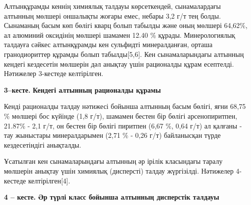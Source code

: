 Алтынқұрамды кеннің химиялық талдауы көрсеткендей, сынамалардағы
алтынның мөлшері оншалықты жоғары емес, небары 3,2 г/т тең болды.
Сынаманың басым көп бөлігі кварц болып табылды және оның мөлшері
64,62\%, ал алюминий оксидінің мөлшері шамамен 12.40 \% құрады.
Минерологиялық талдауға сәйкес алтынқұрамды кен сульфидті минералданған,
орташа гранодиориттер құрамды болып табылды{[}5,6{]}. Кен
сынамаларындағы алтынның кендегі кездесетін мөлшерін дәл анықтау үшін
рационалды құрам есептелді. Нәтижелер 3-кестеде келтірілген.

{\bfseries 3--кесте.} {\bfseries Кендегі алтынның рационалды құрамы}


Кенді рационалды талдау нәтижесі бойынша алтынның басым бөлігі, яғни
68,75 \% мөлшері бос күйінде (1,8 г/т), шамамен бестен бір бөлігі
арсенопиритпен, 21.87\% - 2,1 г/т, он бестен бір бөлігі пиритпен (6,67
\%, 0,64 г/т) ал қалғаны - тау жыныстары минералдарымен (2,71 \% - 0,26
г/т) байланысқан түрде кездесетіндігі анықталды.

Ұсатылған кен сынамаларындағы алтынның әр ірілік класындағы таралу
мөлшерін анықтау үшін химиялық (дисперсті) талдау жүргізілді. Нәтижелер
4-кестеде келтірілген{[}4{]}.

{\bfseries 4 -- кесте. Әр түрлі класс бойынша алтынның дисперстік талдауы}

